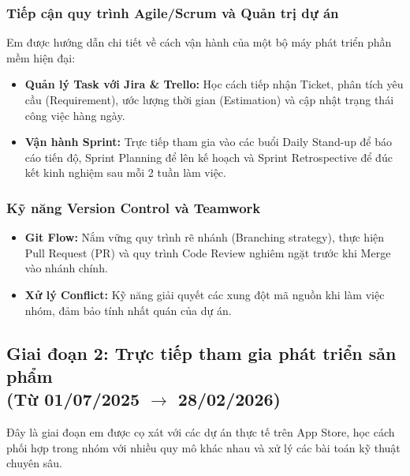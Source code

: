 \documentclass[12pt, a4paper]{article}
\begin{document}
\subsubsection{Tiếp cận quy trình Agile/Scrum và Quản trị dự án}
Em được hướng dẫn chi tiết về cách vận hành của một bộ máy phát triển phần mềm hiện đại:
\begin{itemize}
    \item \textbf{Quản lý Task với Jira \& Trello:} Học cách tiếp nhận Ticket, phân tích yêu cầu (Requirement), ước lượng thời gian (Estimation) và cập nhật trạng thái công việc hàng ngày.
    \item \textbf{Vận hành Sprint:} Trực tiếp tham gia vào các buổi Daily Stand-up để báo cáo tiến độ, Sprint Planning để lên kế hoạch và Sprint Retrospective để đúc kết kinh nghiệm sau mỗi 2 tuần làm việc.
\end{itemize}

\subsubsection{Kỹ năng Version Control và Teamwork}
\begin{itemize}
    \item \textbf{Git Flow:} Nắm vững quy trình rẽ nhánh (Branching strategy), thực hiện Pull Request (PR) và quy trình Code Review nghiêm ngặt trước khi Merge vào nhánh chính.
    \item \textbf{Xử lý Conflict:} Kỹ năng giải quyết các xung đột mã nguồn khi làm việc nhóm, đảm bảo tính nhất quán của dự án.
\end{itemize}

\subsection[Giai đoạn 2: Trực tiếp tham gia phát triển sản phẩm (Từ 01/07/2025 đến 28/02/2026)]{Giai đoạn 2: Trực tiếp tham gia phát triển sản phẩm \\(Từ 01/07/2025 $\rightarrow$ 28/02/2026)}
Đây là giai đoạn em được cọ xát với các dự án thực tế trên App Store, học cách phối hợp trong nhóm với nhiều quy mô khác nhau và xử lý các bài toán kỹ thuật chuyên sâu.
\end{document}
